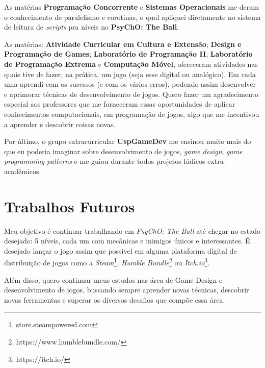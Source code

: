 As matérias \textbf{Programação Concorrente} e \textbf{Sistemas Operacionais} me deram o conhecimento de paralelismo e corotinas, o qual apliquei diretamente no sistema de leitura de \textit{scripts} pra níveis no \textbf{PsyChO: The Ball}.

As matérias: \textbf{Atividade Curricular em Cultura e Extensão}; \textbf{Design e Programação de Games}; \textbf{Laboratório de Programação II}; \textbf{Laboratório de Programação Extrema} e \textbf{Computação Móvel}, ofereceram atividades nas quais tive de fazer, na prática, um jogo (seja esse digital ou analógico). Em cada uma aprendi com os sucessos (e com os vários erros), podendo assim desenvolver e aprimorar técnicas de desenvolvimento de jogos. Quero fazer um agradecimento especial aos professores que me forneceram essas oportunidades de aplicar conhecimentos computacionais, em programação de jogos, algo que me incentivou a aprender e descobrir coisas novas.

Por último, o grupo extracurricular \textbf{UspGameDev} me ensinou muito mais do que eu poderia imaginar sobre desenvolvimento de jogos, \textit{game design}, \textit{game programming patterns} e me guiou durante todos projetos lúdicos extra-acadêmicos.

\section{Trabalhos Futuros}
\label{sec:trabalhos_futuros}

Meu objetivo é continuar trabalhando em \textit{PsyChO: The Ball} até chegar no estado desejado: 5 níveis, cada um com mecânicas e inimigos únicos e interessantes. É desejado lançar o jogo assim que possível em alguma plataforma dígital de distribuição de jogos como a \textit{Steam}\footnote{store.steampowered.com}, \textit{Humble Bundle}\footnote{https://www.humblebundle.com/} ou \textit{Itch.io}\footnote{https://itch.io/}.

Além disso, quero continuar meus estudos nas área de Game Design e desenvolvimento de jogos, buscando sempre aprender novas técnicas, descobrir novas ferramentas e superar os diversos desafios que compõe essa área.
